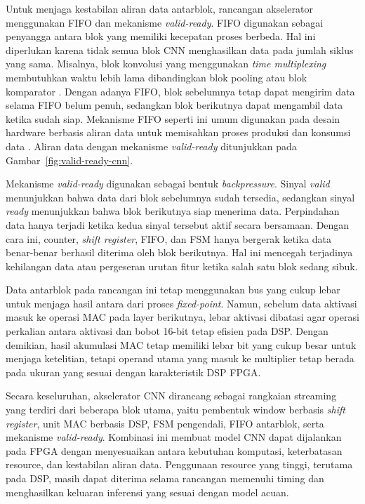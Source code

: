 	Untuk menjaga kestabilan aliran data antarblok, rancangan
	akselerator menggunakan FIFO dan mekanisme \emph{valid-ready}.
	FIFO digunakan sebagai penyangga antara blok yang memiliki kecepatan
	proses berbeda. Hal ini diperlukan karena tidak semua blok CNN
	menghasilkan data pada jumlah siklus yang sama. Misalnya, blok
	konvolusi yang menggunakan \emph{time multiplexing} membutuhkan
	waktu lebih lama dibandingkan blok pooling atau blok komparator
	\cite{Kim2017ThreadedCNNFIFO}. Dengan adanya FIFO, blok sebelumnya
	tetap dapat mengirim data selama FIFO belum penuh, sedangkan blok
	berikutnya dapat mengambil data ketika sudah siap. Mekanisme FIFO
	seperti ini umum digunakan pada desain hardware berbasis aliran data
	untuk memisahkan proses produksi dan konsumsi data \cite{Cummings2002AsyncFIFO}.
	Aliran data dengan mekanisme \emph{valid-ready} ditunjukkan pada
	Gambar~\ref{fig:valid-ready-cnn}.

	Mekanisme \emph{valid-ready} digunakan sebagai bentuk \emph{backpressure}.
	Sinyal \emph{valid} menunjukkan bahwa data dari blok sebelumnya sudah
	tersedia, sedangkan sinyal \emph{ready} menunjukkan bahwa blok berikutnya
	siap menerima data. Perpindahan data hanya terjadi ketika kedua sinyal
	tersebut aktif secara bersamaan. Dengan cara ini, counter,
	\emph{shift register}, FIFO, dan FSM hanya bergerak ketika data
	benar-benar berhasil diterima oleh blok berikutnya. Hal ini mencegah
	terjadinya kehilangan data atau pergeseran urutan fitur ketika salah
	satu blok sedang sibuk.

	Data antarblok pada rancangan ini tetap menggunakan bus yang cukup
	lebar untuk menjaga hasil antara dari proses \emph{fixed-point}.
	Namun, sebelum data aktivasi masuk ke operasi MAC pada layer
	berikutnya, lebar aktivasi dibatasi agar operasi perkalian antara
	aktivasi dan bobot 16-bit tetap efisien pada DSP. Dengan demikian,
	hasil akumulasi MAC tetap memiliki lebar bit yang cukup besar untuk
	menjaga ketelitian, tetapi operand utama yang masuk ke multiplier
	tetap berada pada ukuran yang sesuai dengan karakteristik DSP FPGA.

	Secara keseluruhan, akselerator CNN dirancang sebagai rangkaian
	streaming yang terdiri dari beberapa blok utama, yaitu pembentuk
	window berbasis \emph{shift register}, unit MAC berbasis DSP, FSM
	pengendali, FIFO antarblok, serta mekanisme \emph{valid-ready}.
	Kombinasi ini membuat model CNN dapat dijalankan pada FPGA dengan
	menyesuaikan antara kebutuhan komputasi, keterbatasan resource, dan
	kestabilan aliran data. Penggunaan resource yang tinggi,
	terutama pada DSP, masih dapat diterima selama rancangan memenuhi
	timing dan menghasilkan keluaran inferensi yang sesuai dengan model
	acuan.

